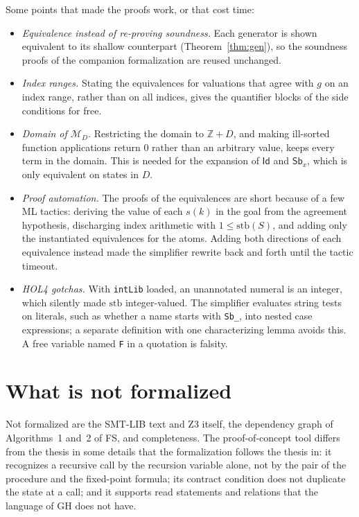 \documentclass[11pt]{article}
\newcommand{\Id}{\mathsf{Id}}
\newcommand{\Sb}[2]{\mathsf{Sb}^{#1}_{#2}}
\newcommand{\stb}{\mathrm{stb}}
\newcommand{\M}{\mathcal{M}}
\newcommand{\Z}{\mathbb{Z}}
\newcommand{\Th}[1]{#1 of FS}
\theoremstyle{plain}
\theoremstyle{definition}
\theoremstyle{remark}
\begin{document}
Some points that made the proofs work, or that cost time:
\begin{itemize}
\item \emph{Equivalence instead of re-proving soundness.} Each generator is
  shown equivalent to its shallow counterpart (Theorem~\ref{thm:gen}), so
  the soundness proofs of the companion formalization are reused unchanged.
\item \emph{Index ranges.} Stating the equivalences for valuations that
  agree with $g$ on an index range, rather than on all indices, gives the
  quantifier blocks of the side conditions for free.
\item \emph{Domain of $\M_D$.} Restricting the domain to $\Z + D$, and
  making ill-sorted function applications return $0$ rather than an
  arbitrary value, keeps every term in the domain. This is needed for the
  expansion of $\Id$ and $\Sb{}{x}$, which is only equivalent on states in
  $D$.
\item \emph{Proof automation.} The proofs of the equivalences are short
  because of a few ML tactics: deriving the value of each $s(k)$ in the
  goal from the agreement hypothesis, discharging index arithmetic with
  $1 \le \stb(S)$, and adding only the instantiated equivalences for the
  atoms. Adding both directions of each equivalence instead made the
  simplifier rewrite back and forth until the tactic timeout.
\item \emph{HOL4 gotchas.} With \texttt{intLib} loaded, an unannotated
  numeral is an integer, which silently made $\stb$ integer-valued. The
  simplifier evaluates string tests on literals, such as whether a name
  starts with \texttt{Sb\_}, into nested case expressions; a separate
  definition with one characterizing lemma avoids this. A free variable
  named \texttt{F} in a quotation is falsity.
\end{itemize}

\section{What is not formalized}

Not formalized are the SMT-LIB text and Z3 itself, the dependency graph of
\Th{Algorithms~1 and~2}, and completeness. The proof-of-concept tool
differs from the thesis in some details that the formalization follows the
thesis in: it recognizes a recursive call by the recursion variable alone,
not by the pair of the procedure and the fixed-point formula; its contract
condition does not duplicate
the state at a call; and it supports read statements and relations that
the language of GH does not have.
\end{document}
